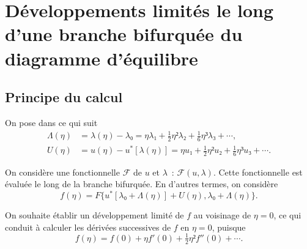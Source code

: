 \documentclass[12pt, final]{scrartcl}
\theoremstyle{definition}
\begin{document}
\appendix
\section{Développements limités le long d'une branche bifurquée du diagramme d'équilibre}

\subsection{Principe du calcul}
\label{sec:20220107121442}
%

On pose dans ce qui suit
\begin{align}
  \label{eq:20211112155446}
  Λ(η) & = λ(η) - λ₀ = η λ₁ + \tfrac{1}{2} η² λ₂ + \tfrac{1}{6} η³ λ₃ + \cdots,\\
  \label{eq:20211112113028}
  U(η) & = u(η) - u^{\ast}[λ(η)] = η u₁ + \tfrac{1}{2} η² u₂ + \tfrac{1}{6} η³ u₃ + \cdots.
\end{align}

On considère une fonctionnelle \(\mathcal{F}\) de \(u\) et \(λ\)~:
\(\mathcal{F}(u, λ)\). Cette fonctionnelle est évaluée le long de la branche
bifurquée. En d'autres termes, on considère
\begin{equation*}
  f(η) = F\{ u^{\ast} [λ₀ + Λ(η)] + U(η), λ₀ + Λ(η) \}.
\end{equation*}

On souhaite établir un développement limité de \(f\) au voisinage de \(η = 0\),
ce qui conduit à calculer les dérivées successives de \(f\) en \(η = 0\),
puisque
\begin{equation*}
  f(η) = f(0) + η f'(0) + \tfrac{1}{2} η² f''(0) + \cdots.
\end{equation*}
\end{document}
